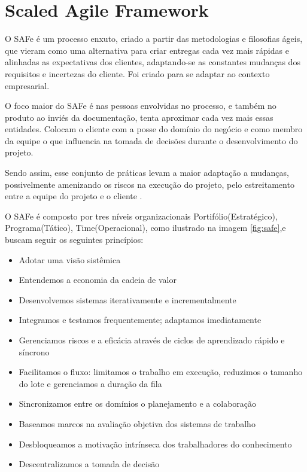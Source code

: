 \section{Scaled Agile Framework}

O SAFe é um processo enxuto, criado a partir das metodologias e filosofias ágeis,
que vieram como uma alternativa para criar entregas cada vez mais rápidas e alinhadas
as expectativas dos clientes, adaptando-se as constantes mudanças dos requisitos
e incertezas do cliente. Foi criado para se adaptar ao contexto empresarial.

O foco maior do SAFe é nas pessoas envolvidas no processo, e também no produto ao
inviés da documentação, tenta aproximar cada vez mais essas entidades. Colocam o
cliente com a posse do domínio do negócio e como membro da equipe o que influencia
na tomada de decisões durante o desenvolvimento do projeto.

Sendo assim, esse conjunto de práticas levam a maior adaptação a mudanças, possivelmente
amenizando os riscos na execução do projeto, pelo estreitamento entre a equipe do projeto
e o cliente \cite{BOEHM}.

O SAFe é composto por tres níveis organizacionais Portifólio(Estratégico),
Programa(Tático), Time(Operacional), como ilustrado na imagem \ref{fig:safe},e buscam seguir os seguintes princípios:

\begin{itemize}
  \item Adotar uma visão sistêmica
  \item Entendemos a economia da cadeia de valor
  \item Desenvolvemos sistemas iterativamente e incrementalmente
  \item Integramos e testamos frequentemente; adaptamos imediatamente
  \item Gerenciamos riscos e a eficácia através de ciclos de aprendizado rápido e síncrono
  \item Facilitamos o fluxo: limitamos o trabalho em execução, reduzimos o tamanho
  do lote e gerenciamos a duração da fila
  \item Sincronizamos entre os domínios o planejamento e a colaboração
  \item Baseamos marcos na avaliação objetiva dos sistemas de trabalho
  \item Desbloqueamos a motivação intrínseca dos trabalhadores do conhecimento
  \item Descentralizamos a tomada de decisão
\end{itemize}

